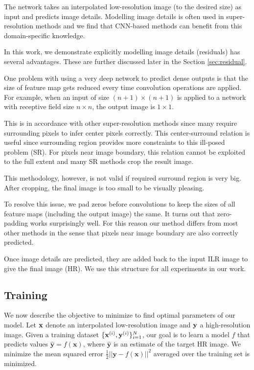 \documentclass[10pt,twocolumn,letterpaper]{article}
\begin{document}
The network takes an interpolated low-resolution image (to the desired size) as input and predicts image details. Modelling image details is often used in super-resolution methods \cite{Timofte2013, Timofte, bevilacqua2012,bevilacqua2013super} and we find that CNN-based methods can benefit from this domain-specific knowledge.

In this work, we demonstrate explicitly modelling image details (residuals) has several advantages. These are further discussed later in the Section \ref{sec:residual}. 

One problem with using a very deep network to predict dense outputs is that the size of feature map gets reduced every time convolution operations are applied. For example,  when an input of size $(n+1)\times (n+1)$ is applied to a network with receptive field size $n\times n$, the output image is $1\times1$. 

This is in accordance with other super-resolution methods since many require surrounding pixels to infer center pixels correctly. This center-surround relation is useful since surrounding region provides more constraints to this ill-posed problem (SR). For pixels near image boundary, this relation cannot be exploited to the full extent and many SR methods crop the result image. 

This methodology, however, is not valid if required surround region is very big. After cropping, the final image is too small to be visually pleasing.

To resolve this issue, we pad zeros before convolutions to keep the sizes of all feature maps (including the output image) the same. It turns out that zero-padding works surprisingly well. For this reason our method differs from most other methods in the sense that pixels near image boundary are also correctly predicted.  

Once image details are predicted, they are added back to the input ILR image to give the final image (HR). We use this structure for all experiments in our work.  


\subsection{Training}

We now describe the objective to minimize to find optimal parameters of our model. Let ${\bf x}$ denote an interpolated low-resolution image and ${\bf y}$ a high-resolution image. 
Given a training dataset $\{{\bf x}^{(i)},{\bf y}^{(i)}\}{}_{i=1}^{N}$, our goal is to learn a model $f$ that predicts values $\mathbf{\hat{y}}=f(\mathbf{x})$, where $\mathbf{\hat{y}}$ is an estimate of the target HR image. We minimize the mean squared error $\frac{1}{2}||\mathbf{y}-f(\mathbf{x})||^{2}$
averaged over the training set is minimized. 
\end{document}
